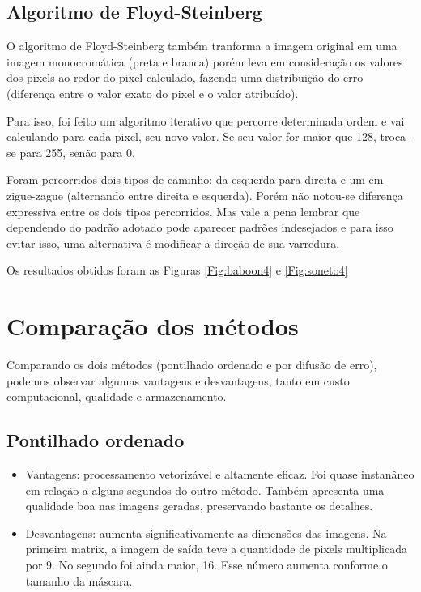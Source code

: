 \documentclass{article}
\begin{document}
\subsection{Algoritmo de Floyd-Steinberg}

O algoritmo de Floyd-Steinberg também tranforma a imagem original em uma imagem monocromática (preta e branca) porém leva em consideração os valores dos pixels ao redor do pixel calculado, fazendo uma distribuição do erro (diferença entre o valor exato do pixel e o valor atribuído).

Para isso, foi feito um algoritmo iterativo que percorre determinada ordem e vai calculando para cada pixel, seu novo valor. Se seu valor for maior que 128, troca-se para 255, senão para 0.

Foram percorridos dois tipos de caminho: da esquerda para direita e um em zigue-zague (alternando entre direita e esquerda). Porém não notou-se diferença expressiva entre os dois tipos percorridos. Mas vale a pena lembrar que dependendo do padrão adotado pode aparecer padrões indesejados e para isso evitar isso, uma alternativa é modificar a direção de sua varredura.

Os resultados obtidos foram as Figuras \ref{Fig:baboon4} e \ref{Fig:soneto4}

\section{Comparação dos métodos}

Comparando os dois métodos (pontilhado ordenado e por difusão de erro), podemos observar algumas vantagens e desvantagens, tanto em custo computacional, qualidade e armazenamento.

\subsection{Pontilhado ordenado}

\begin{itemize}
    \item Vantagens: processamento vetorizável e altamente eficaz. Foi quase instanâneo em relação a alguns segundos do outro método. Também apresenta uma qualidade boa nas imagens geradas, preservando bastante os detalhes.

    \item Desvantagens: aumenta significativamente as dimensões das imagens. Na primeira matrix, a imagem de saída teve a quantidade de pixels multiplicada por 9. No segundo foi ainda maior, 16. Esse número aumenta conforme o tamanho da máscara. 
\end{itemize}
\end{document}

